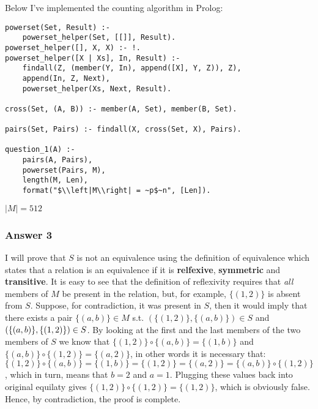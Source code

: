 \documentclass[11pt]{article}
\begin{document}
Below I've implemented the counting algorithm in Prolog:

\lstset{language=prolog,numbers=none}
\begin{lstlisting}
powerset(Set, Result) :-
    powerset_helper(Set, [[]], Result).
powerset_helper([], X, X) :- !.
powerset_helper([X | Xs], In, Result) :-
    findall(Z, (member(Y, In), append([X], Y, Z)), Z),
    append(In, Z, Next),
    powerset_helper(Xs, Next, Result).

cross(Set, (A, B)) :- member(A, Set), member(B, Set).

pairs(Set, Pairs) :- findall(X, cross(Set, X), Pairs).

question_1(A) :-
    pairs(A, Pairs),
    powerset(Pairs, M),
    length(M, Len),
    format("$\\left|M\\right| = ~p$~n", [Len]).
\end{lstlisting}

$\left|M\right| = 512$
\subsubsection{Answer 3}
\label{sec-1-1-2}
I will prove that $S$ is not an equivalence using the definition of
equivalence which states that a relation is an equivalence if it is
\textbf{relfexive}, \textbf{symmetric} and \textbf{transitive}.  It is easy to see that the
definition of reflexivity requires that \emph{all} members of $M$ be present in
the relation, but, for example, $\{(1, 2)\}$ is absent from $S$.  Suppose,
for contradiction, it was present in $S$, then it would imply that there
exists a pair $\{(a, b)\} \in M$ s.t. $(\{(1, 2)\}, \{(a, b)\}) \in S$ and
$(\{(a, b)\}, \{(1, 2)\}) \in\nobreak S$.  By looking at the first and the
last members of the two members of $S$ we know that $\{(1, 2)\} \circ \{(a,
    b)\} = \{(1, b)\}$ and $\{(a, b)\} \circ \{(1, 2)\} = \{(a, 2)\}$, in other
words it is necessary that: $\{(1, 2)\} \circ \{(a, b)\} = \{(1, b)\} =
    \{(1, 2)\} = \{(a, 2)\} = \{(a, b)\} \circ \{(1, 2)\}$, which in turn, means
that $b=2$ and $a=1$.  Plugging these values back into original equilaty
gives $\{(1, 2)\} \circ \{(1, 2)\} = \{(1, 2)\}$, which is obviously false.
Hence, by contradiction, the proof is complete.
\end{document}
